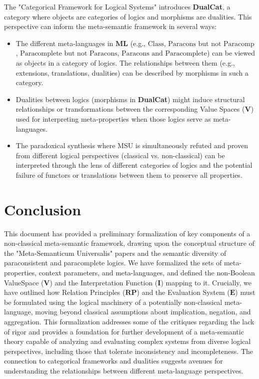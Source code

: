 \documentclass{article}
\newcommand{\InterpFunc}{\mathbf{I}}
\newcommand{\RelPrinciples}{\mathbf{RP}}
\newcommand{\EvalSystem}{\mathbf{E}}
\newcommand{\ValueSpace}{\mathbf{V}}
\newcommand{\MetaLang}{\mathbf{ML}}
\newcommand{\MLClass}{\text{Class}}
\newcommand{\MLParacons}{\text{Paracons but not Paracomp}}
\newcommand{\MLParacomp}{\text{Paracomplete but not Paracons}}
\newcommand{\MLBoth}{\text{Paracons and Paracomplete}}
\begin{document}
																	The "Categorical Framework for Logical Systems" introduces \textbf{DualCat}, a category where objects are categories of logics and morphisms are dualities. This perspective can inform the meta-semantic framework in several ways:
																	
																	\begin{itemize}[wide, labelwidth=!, labelindent=0pt, before=\RaggedRight, after=\RaggedRight] %
																		\item The different meta-languages in $\MetaLang$ (e.g., $\MLClass$, $\MLParacons$, $\MLParacomp$, $\MLBoth$) can be viewed as objects in a category of logics. The relationships between them (e.g., extensions, translations, dualities) can be described by morphisms in such a category.
																		\item Dualities between logics (morphisms in \textbf{DualCat}) might induce structural relationships or transformations between the corresponding Value Spaces ($\ValueSpace$) used for interpreting meta-properties when those logics serve as meta-languages.
																		\item The paradoxical synthesis where MSU is simultaneously refuted and proven from different logical perspectives (classical vs. non-classical) can be interpreted through the lens of different categories of logics and the potential failure of functors or translations between them to preserve all properties.
																	\end{itemize}
																	
																	\section{Conclusion}
																	
																	\RaggedRight %
																	This document has provided a preliminary formalization of key components of a non-classical meta-semantic framework, drawing upon the conceptual structure of the "Meta-Semanticum Universalis" papers and the semantic diversity of paraconsistent and paracomplete logics. We have formalized the sets of meta-properties, context parameters, and meta-languages, and defined the non-Boolean ValueSpace ($\ValueSpace$) and the Interpretation Function ($\InterpFunc$) mapping to it. Crucially, we have outlined how Relation Principles ($\RelPrinciples$) and the Evaluation System ($\EvalSystem$) must be formulated using the logical machinery of a potentially non-classical meta-language, moving beyond classical assumptions about implication, negation, and aggregation. This formalization addresses some of the critiques regarding the lack of rigor and provides a foundation for further development of a meta-semantic theory capable of analyzing and evaluating complex systems from diverse logical perspectives, including those that tolerate inconsistency and incompleteness. The connection to categorical frameworks and dualities suggests avenues for understanding the relationships between different meta-language perspectives.
																	
\end{document}
